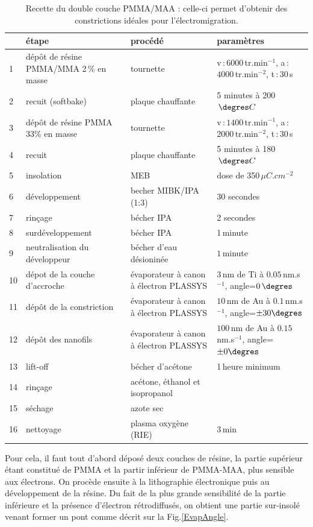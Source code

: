 \begin{table}
\begin{center}
\begin{tabular}{|p{0.5cm}|p{4cm}|p{4cm}|p{3cm}|}
  \hline
\,& \textbf{étape} & \textbf{procédé} & \textbf{paramètres} \tabularnewline
\hline
1 &  dép\^ot de résine PMMA/MMA 2\,\% en masse & tournette & v\,:\,$6000\,$tr.min$^{-1}$, a\,:\,$4000\,$tr.min$^{-2}$, t\,:\,$30\,$s 
\tabularnewline
\hline
 2 & recuit (softbake) & plaque chauffante  & 5 minutes à 200$\, \degres C$ 
\tabularnewline
\hline
 3 & dépôt de résine PMMA 33\% en masse & tournette & v\,:\,$1400\,$tr.min$^{-1}$, a\,:\,$2000\,$tr.min$^{-2}$, t\,:\,$30\,$s \tabularnewline
\hline
4 & recuit & plaque chauffante & 5 minutes à 180$\, \degres C$
\tabularnewline
\hline
5 & insolation & MEB & dose de 350\,$\mu C.cm^{-2}$
\tabularnewline
\hline
6 & développement & becher MIBK/IPA (1:3) & 30 secondes
\tabularnewline
\hline
7 & rinçage & bécher IPA & 2 secondes
\tabularnewline
\hline
8 & surdéveloppement & bécher IPA & 1\,minute
\tabularnewline
\hline
9 & neutralisation du développeur &bécher d'eau désioninée & $1\,$minute\tabularnewline
\hline
10 & dépot de la couche d'accroche & évaporateur à canon à électron PLASSYS & $3\,$nm de Ti à $0.05\,$nm.s$^{-1}$, angle=$0\,\degres$
\tabularnewline
\hline
11 & dépôt de la constriction & évaporateur à canon à électron PLASSYS & $10\,$nm de Au à $0.1\,$nm.s$^{-1}$, angle=$\pm 30\degres$
\tabularnewline
\hline
12 &  dépôt des nanofils &  évaporateur à canon à électron PLASSYS  &  $100\,$nm de Au à $0.15\,$nm.s$^{-1}$, angle=$\pm 0\degres$
\tabularnewline
\hline
 13 & lift-off & bécher d'acétone & 1\,heure minimum 
\tabularnewline
\hline
14 & rinçage & acétone, éthanol et isopropanol & 
\tabularnewline
\hline
15 & séchage & azote sec & 
\tabularnewline
\hline
16 & nettoyage & plasma oxygène (RIE)& $3\,$min\tabularnewline
\hline
\end{tabular}
\caption{Recette du double couche PMMA/MAA : celle-ci permet d'obtenir des constrictions idéales pour l'électromigration.}
\label{tab_recette_elec}
\end{center}
\end{table}




Pour cela, il faut tout d'abord déposé deux couches de résine, la partie supérieur étant constitué de PMMA et la partir inférieur de PMMA-MAA, plus sensible aux électrons. On procède ensuite à la lithographie électronique puis au développement de la résine. Du fait de la plus grande sensibilité de la partie inférieure et la présence d'électron rétrodiffusés, on obtient une partie sur-insolé venant former un pont comme décrit sur la Fig.\ref{EvapAngle}.

